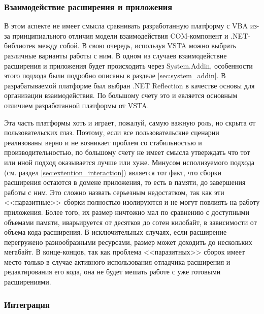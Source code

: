 \subsubsection{Взаимодействие расширения и приложения}

В этом аспекте не имеет смысла сравнивать разработанную платформу с VBA из-за принципиального отличия модели взаимодействия COM-компонент и .NET-библиотек между собой. В свою очередь, используя VSTA можно выбрать различные варианты работы с ним. В одном из случаев взаимодействие расширения и приложения будет происходить через System.Addin, особенности этого подхода были подробно описаны в разделе \ref{sec:system_addin}. В разрабатываемой платформе был выбран .NET Reflection в качестве основы для организации взаимодействия. По большому счету это и евляется основным отличием разработанной платформы от VSTA.

Эта часть платформы хоть и играет, пожалуй, самую важную роль, но скрыта от пользовательских глаз. Поэтому, если все пользовательские сценарии реализованы верно и не возникает проблем со стабильностью и производительностью, по большому счету не имеет смысла утверждать что тот или иной подход оказывается лучше или хуже. Минусом исполизуемого подхода (см. раздел \ref{sec:extention_interaction}) является тот факт, что сборки расширения остаются в домене приложения, то есть в памяти, до завершения работы с ним. Это сложно назвать серьезным недостатком, так как эти <<паразитные>> сборки полностью изолируются и не могут повлиять на работу приложения. Более того, их размер ничтожно мал по сравнению с доступными объемами памяти, иварьируется от десятков до сотен килобайт, в зависимости от объема кода расширения. В исключительных случаях, если расширение перегружено разнообразными ресурсами, размер может доходить до нескольких мегабайт. В конце-концов, так как проблема <<паразитных>> сборок имеет место только в случае активного использования отладчика расширения и редактирования его кода, она не будет мешать работе с уже готовыми расширениями.

\subsubsection{Интеграция}


\pagebreak
